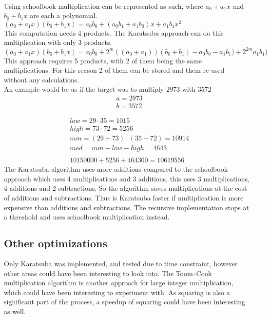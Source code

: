 \\
Using schoolbook multiplication can be represented as such, where $a_0 + a_1x$ and $b_0 + b_1x$ are each a polynomial.\\
$(a_0 + a_1 x)(b_0 + b_1 x) = a_0 b_0 + (a_0 b_1 + a_1 b_0 )x + a_1 b_1 x^2$\\
This computation needs 4 products. The Karatsuba approach can do this multiplication with only 3 products.\\
$(a_0 + a_1 x)(b_0 + b_1 x) = a_0 b_0 + 2^m ((a_0+a_1))(b_0 + b_1)-a_0 b_0 - a_1 b_1) + 2^{2m} a_1 b_1)$\\
This approach requires 5 products, with 2 of them being the same multiplications. For this reason 2 of them can be stored and them re-used without any calculations.\medskip
\\
An example would be as if the target was to multiply $2973$ with $3572$ \\
\begin{equation*}
    \begin{split}
        & a = 2973\\
        & b = 3572
    \end{split}
\end{equation*}

\begin{equation*}
    \begin{split}
        & low = 29 \cdot 35 = 1015\\
        & high = 73 \cdot 72 = 5256\\
        & mm = (29 + 73) \cdot (35 + 72) = 10914\\
        & med = mm - low - high = 4643\\
        \\
        & 10150000 + 5256 + 464300 = 10619556
    \end{split}
\end{equation*}
The Karatsuba algorithm uses more additions compared to the schoolbook approach which uses 4 multiplications and 3 additions, this uses 3 multiplications, 4 additions and 2 subtractions. So the algorithm saves multiplications at the cost of additions and subtractions. Thus is Karatsuba faster if multiplication is more expensive than additions and subtractions. The recursive implementation stops at a threshold and uses schoolbook multiplication instead.

\subsection{Other optimizations}
Only Karatsuba was implemented, and tested due to time constraint, however other areas could have been interesting to look into. The Toom–Cook multiplication algorithm is another approach for large integer multiplication, which could have been interesting to experiment with. As squaring is also a significant part of the process, a speedup of squaring could have been interesting as well. \\
\medskip